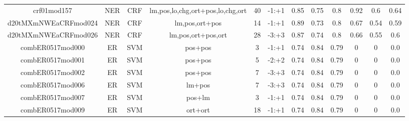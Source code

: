 \documentclass[a4paper]{article}
\begin{document}
\begin{landscape}
\begin{center}
\begin{tabular}{ |c|c|c|c|c|c|c|c|c|c|c|c|}
 	
 
 	
 		
 		\small{ crf01mod157 } & NER & CRF & lm,pos,lo,chg,ort+pos,lo,chg,ort  &  40 &  -1:+1  &  0.85 & 0.75 & 0.8  &  0.92 & 0.6 & 0.64 \\
 		

 	
 
 	
 		
 		\small{ d20tMXmNWEaCRFmod024 } & NER & CRF & lm,pos,ort+pos  &  14 &  -1:+1  &  0.89 & 0.73 & 0.8  &  0.67 & 0.54 & 0.59 \\
 		

 	
 
 	
 		
 		\small{ d20tMXmNWEaCRFmod026 } & NER & CRF & lm,pos,ort+pos,ort  &  28 &  -3:+3  &  0.87 & 0.74 & 0.8  &  0.66 & 0.55 & 0.6 \\
 		

 	
 
 	
 		
 		\small{ combER0517mod000 } & ER & SVM & pos+pos  &  3 &  -1:+1  &  0.74 & 0.84 & 0.79  &  0 & 0 & 0.0 \\
 		

 	
 
 	
 		
 		\small{ combER0517mod001 } & ER & SVM & pos+pos  &  5 &  -2:+2  &  0.74 & 0.84 & 0.79  &  0 & 0 & 0.0 \\
 		

 	
 
 	
 		
 		\small{ combER0517mod002 } & ER & SVM & pos+pos  &  7 &  -3:+3  &  0.74 & 0.84 & 0.79  &  0 & 0 & 0.0 \\
 		

 	
 
 	
 		
 		\small{ combER0517mod006 } & ER & SVM & lm+pos  &  7 &  -3:+3  &  0.74 & 0.84 & 0.79  &  0 & 0 & 0.0 \\
 		

 	
 
 	
 		
 		\small{ combER0517mod007 } & ER & SVM & pos+lm  &  3 &  -1:+1  &  0.74 & 0.84 & 0.79  &  0 & 0 & 0.0 \\
 		

 	
 
 	
 		
 		\small{ combER0517mod009 } & ER & SVM & ort+ort  &  18 &  -1:+1  &  0.74 & 0.84 & 0.79  &  0 & 0 & 0.0 \\
 		


\end{tabular}
\end{center}
\end{landscape}
\end{document}
